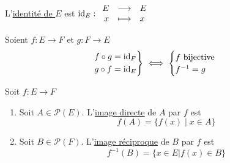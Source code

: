 \begin{defn}
	L'\underline{identité de $E$} est $\operatorname{id}_E : \begin{array}{rcl}
		E &\longrightarrow& E \\
		x &\longmapsto& x
	\end{array}$
\end{defn}

\begin{prop}
	Soient $f: E \to F$ et $g: F \to E$ \\
	\[
		\begin{rcases*}
			f \circ g = \id_F\\
			g \circ f = \id_E
		\end{rcases*}
		\iff \begin{cases}
			f \text{ bijective}\\
			f^{-1}=g
		\end{cases}
	\] 
\end{prop}

\begin{prv}
\end{prv}

\begin{defn}
	Soit $f: E \to F$ 
	\begin{enumerate}
		\item Soit $A \in \mathcal{P}(E)$. L'\underline{image directe} de $A$ par $f$ est \[
				f(A) = \{f(x)  \mid x \in A\} 
			\]
			\vspace{-1.5cm}
			\begin{center}
			\end{center}
			\vspace{-2cm}

		\item Soit $B \in \mathcal{P}(F)$. L'\underline{image réciproque} de $B$ par $f$ est \[
				f^{-1}(B) = \{x \in E | f(x) \in B\}
			\]
			\vspace{-1.5cm}
			\begin{center}
			\end{center}
			\vspace{-2cm}
	\end{enumerate}
\end{defn}
